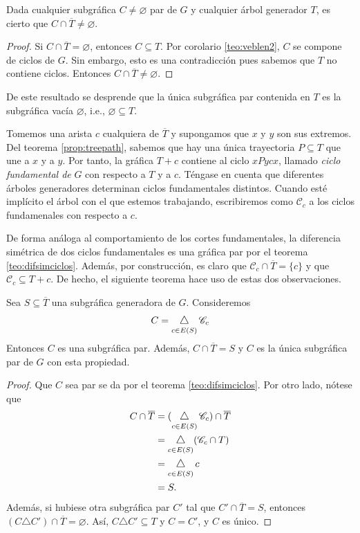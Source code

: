 \begin{prop}
Dada cualquier subgráfica $C \neq \varnothing$ par de $G$ y cualquier árbol generador $T$, es cierto que $C \cap \overline{T} \neq \varnothing$.
\end{prop}

\begin{proof}
Si $C \cap \overline{T} = \varnothing$, entonces $C \subseteq T$. Por corolario  \ref{teo:veblen2}, $C$ se compone de ciclos de $G$. Sin embargo, esto es una contradicción pues sabemos que $T$ no contiene ciclos. Entonces $C \cap \overline{T} \neq \varnothing$.

\end{proof}

De este resultado se desprende que la única subgráfica par contenida en $T$ es la subgráfica vacía $\varnothing$, i.e., $\varnothing \subseteq T$.


Tomemos una arista $c$ cualquiera  de $\overline{T}$ y supongamos que $x$ y $y$ son sus extremos. Del teorema \ref{prop:treepath}, sabemos que hay una única trayectoria $P \subseteq T$ que une a $x$ y a $y$. Por tanto, la gráfica $T + c$ contiene al ciclo $xPycx$, llamado \textit{ciclo fundamental de} $G$ con respecto a $T$ y a $c$. Téngase en cuenta que diferentes árboles generadores determinan ciclos fundamentales distintos. Cuando esté implícito el árbol con el que estemos trabajando, escribiremos como $\mathscr{C}_{c}$ a los ciclos fundamenales con respecto a $c$. 

De forma análoga al comportamiento de los cortes fundamentales, la diferencia simétrica de dos ciclos fundamentales es una gráfica par por el teorema \ref{teo:difsimciclos}. Además, por construcción, es claro que $\mathscr{C}_{c} \cap \overline{T} = \{c\}$ y que $\mathscr{C}_{c} \subseteq T + c$. De hecho, el siguiente teorema hace uso de estas dos observaciones.

\begin{prop} \label{ciclosfundamentalespropchida}
Sea $S \subseteq \overline{T}$ una subgráfica generadora de $G$. Consideremos  
$$
C =\difsym_{c \in E(S)} \mathscr{C}_{c} 
$$
 Entonces $C$ es una subgráfica par. Además, $C \cap \overline{T} = S$ y $C$ es la única subgráfica par de $G$ con esta propiedad.
\end{prop}
 
 \begin{proof}
 Que $C$ sea par se da por el teorema \ref{teo:difsimciclos}. Por otro lado, nótese que
\begin{align*}
    C \cap \overline{T} &=(\difsym_{c \in E(S)} \mathscr{C}_{c}) \cap \overline{T} \\
             &=\difsym_{c \in E(S)} (\mathscr{C}_{c} \cap T) \\
             &=\difsym_{c\in E(S)} c \\
             &= S.
\end{align*}
Además, si hubiese otra subgráfica par $C'$ tal que $C' \cap \overline{T}= S$, entonces $(C \triangle C') \cap \overline{T} = \varnothing$. Así, $C \triangle C' \subseteq T$ y $C = C'$, y $C$ es único.
 \end{proof}

